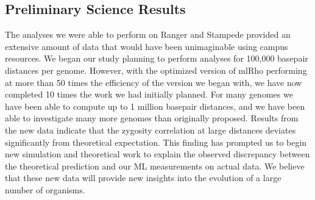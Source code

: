 \documentclass{sig-alternate}
\begin{document}





\subsection{Preliminary Science Results}
The analyses we were able to perform on Ranger and Stampede provided an extensive amount of data that would
have been unimaginable using campus resources. We began our study planning to perform analyses for 100,000
basepair distances per genome. However, with the optimized version of mlRho performing at more than 50
times the efficiency of the version we began with, we have now completed 10 times the work we had initially
planned. For many genomes we have been able to compute up to 1 million basepair distances, and we have been
able to investigate many more genomes than originally proposed. Results from the new data indicate that the
zygosity correlation at large distances deviates significantly from theoretical expectation. This finding has
prompted us to begin new simulation and theoretical work to explain the observed discrepancy between the
theoretical prediction and our ML measurements on actual data. We believe that these new data will provide new
insights into the evolution of a large number of organisms.
\end{document}
